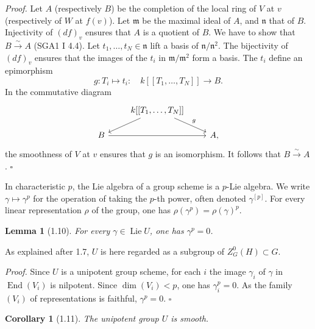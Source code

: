 \documentclass[10pt]{article}
\newcommand{\Lie}{\operatorname{Lie}}
\newcommand{\End}{\operatorname{End}}
\theoremstyle{deligne}
\newtheorem*{lemma*}{Lemma}
\newtheorem*{corollary*}{Corollary}
\newenvironment{proofdel}{\textit{Proof.}}{\hfill$\square$}
\begin{document}
\begin{proofdel}
Let \(A\) (respectively \(B\)) be the completion of the local ring of \(V\) at \(v\) (respectively of \(W\) at \(f(v)\)). Let \(\mathfrak m\) be the maximal ideal of \(A\), and \(\mathfrak n\) that of \(B\). Injectivity of \((df)_v\) ensures that \(A\) is a quotient of \(B\). We have to show that \(B\overset{\sim}{\to}A\) (SGA1 I 4.4). Let \(t_1,\ldots,t_N\in\mathfrak n\) lift a basis of \(\mathfrak n/\mathfrak n^2\). The bijectivity of \((df)_v\) ensures that the images of the \(t_i\) in \(\mathfrak m/\mathfrak m^2\) form a basis. The \(t_i\) define an epimorphism
\[
  g:T_i\longmapsto t_i:\quad k[[T_1,\ldots,T_N]]\longrightarrow B.
\]
In the commutative diagram
\[
\begin{tikzcd}[column sep=2.2em,row sep=1.3em]
& k[[T_1,\ldots,T_N]] \arrow[dl] \arrow[dr,"g"] & \\
B \arrow[rr] && A ,
\end{tikzcd}
\]
the smoothness of \(V\) at \(v\) ensures that \(g\) is an isomorphism. It follows that \(B\overset{\sim}{\to}A\).
\end{proofdel}

In characteristic \(p\), the Lie algebra of a group scheme is a \(p\)-Lie algebra. We write \(\gamma\mapsto\gamma^p\) for the operation of taking the \(p\)-th power, often denoted \(\gamma^{[p]}\). For every linear representation \(\rho\) of the group, one has \(\rho(\gamma^p)=\rho(\gamma)^p\).

\begin{lemma*}[1.10]
For every \(\gamma\in\Lie U\), one has \(\gamma^p=0\).
\end{lemma*}

As explained after 1.7, \(U\) is here regarded as a subgroup of \(Z^0_G(H)\subset G\).

\begin{proofdel}
Since \(U\) is a unipotent group scheme, for each \(i\) the image \(\gamma_i\) of \(\gamma\) in \(\End(V_i)\) is nilpotent. Since \(\dim(V_i)<p\), one has \(\gamma_i^p=0\). As the family \((V_i)\) of representations is faithful, \(\gamma^p=0\).
\end{proofdel}

\begin{corollary*}[1.11]
The unipotent group \(U\) is smooth.
\end{corollary*}
\end{document}
